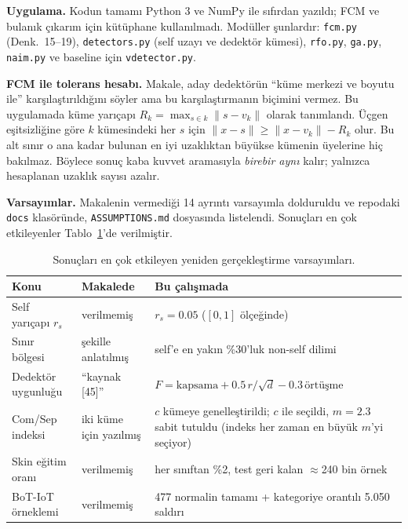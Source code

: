 \documentclass[11pt,a4paper]{article}
\begin{document}
\textbf{Uygulama.} Kodun tamamı Python 3 ve NumPy ile sıfırdan yazıldı; FCM ve bulanık çıkarım için kütüphane kullanılmadı. Modüller şunlardır: \texttt{fcm.py} (Denk.~15--19), \texttt{detectors.py} (self uzayı ve dedektör kümesi), \texttt{rfo.py}, \texttt{ga.py}, \texttt{naim.py} ve baseline için \texttt{vdetector.py}.

\textbf{FCM ile tolerans hesabı.} Makale, aday dedektörün ``küme merkezi ve boyutu ile'' karşılaştırıldığını söyler ama bu karşılaştırmanın biçimini vermez. Bu uygulamada küme yarıçapı $R_k=\max_{s\in k}\lVert s-v_k\rVert$ olarak tanımlandı. Üçgen eşitsizliğine göre $k$ kümesindeki her $s$ için $\lVert x-s\rVert\ge\lVert x-v_k\rVert-R_k$ olur. Bu alt sınır o ana kadar bulunan en iyi uzaklıktan büyükse kümenin üyelerine hiç bakılmaz. Böylece sonuç kaba kuvvet aramasıyla \emph{birebir aynı} kalır; yalnızca hesaplanan uzaklık sayısı azalır.

\textbf{Varsayımlar.} Makalenin vermediği 14 ayrıntı varsayımla dolduruldu ve repodaki \texttt{docs} klasöründe, \texttt{ASSUMPTIONS.md} dosyasında listelendi. Sonuçları en çok etkileyenler Tablo~\ref{tab:assume}'de verilmiştir.

\begin{table}[H]
\centering\small
\caption{Sonuçları en çok etkileyen yeniden gerçekleştirme varsayımları.}\label{tab:assume}
\begin{tabularx}{\textwidth}{@{}lXX@{}}
\toprule
Konu & Makalede & Bu çalışmada \\
\midrule
Self yarıçapı $r_s$ & verilmemiş & $r_s=0.05$ ($[0,1]$ ölçeğinde) \\
Sınır bölgesi & şekille anlatılmış & self'e en yakın \%30'luk non-self dilimi \\
Dedektör uygunluğu & ``kaynak [45]'' & $F=\text{kapsama}+0.5\,r/\sqrt{d}-0.3\,\text{örtüşme}$ \\
Com/Sep indeksi & iki küme için yazılmış & $c$ kümeye genelleştirildi; $c$ ile seçildi, $m=2.3$ sabit tutuldu (indeks her zaman en büyük $m$'yi seçiyor) \\
Skin eğitim oranı & verilmemiş & her sınıftan \%2, test geri kalan $\approx$240 bin örnek \\
BoT-IoT örneklemi & verilmemiş & 477 normalin tamamı + kategoriye orantılı 5.050 saldırı \\
\bottomrule
\end{tabularx}
\end{table}

\end{document}
